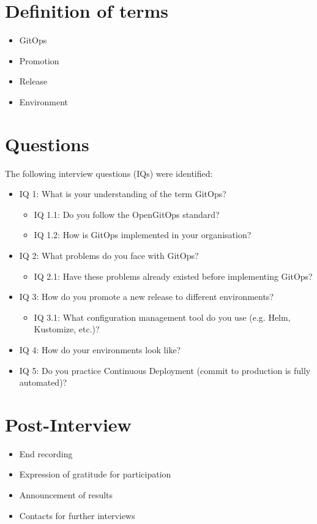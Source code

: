 \section{Definition of terms}

\begin{itemize}
	\item GitOps
	\item Promotion
	\item Release
	\item Environment
\end{itemize}

\section{Questions}\label{appendix:interview-questions}

The following interview questions (IQs) were identified:

\begin{itemize}
	\item IQ 1: What is your understanding of the term GitOps?
	\begin{itemize}
		\item IQ 1.1: Do you follow the OpenGitOps standard?
		\item IQ 1.2: How is GitOps implemented in your organisation?
	\end{itemize}

	\item IQ 2: What problems do you face with GitOps?
	\begin{itemize}
		\item IQ 2.1: Have these problems already existed before implementing GitOps?
	\end{itemize}

	\item IQ 3: How do you promote a new release to different environments?
	\begin{itemize}
		\item IQ 3.1: What configuration management tool do you use (e.g. Helm, Kustomize, etc.)?
	\end{itemize}

	\item IQ 4: How do your environments look like?
	
	\item IQ 5: Do you practice Continuous Deployment (commit to production is fully automated)?

\end{itemize}

\section{Post-Interview}

\begin{itemize}
	\item End recording
	\item Expression of gratitude for participation
	\item Announcement of results
	\item Contacts for further interviews
\end{itemize}
